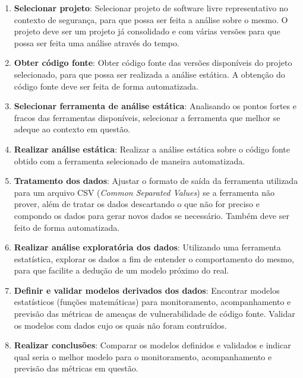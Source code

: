 \begin{enumerate}
  \item \textbf{Selecionar projeto}: Selecionar projeto de software livre
  representativo no contexto de segurança, para que possa ser feita a análise
  sobre o mesmo. O projeto deve ser um projeto já consolidado e com várias
  versões para que possa ser feita uma análise através do tempo.

  \item \textbf{Obter código fonte}: Obter código fonte das versões disponíveis
  do projeto selecionado, para que possa ser realizada a análise estática. A
  obtenção do código fonte deve ser feita de forma automatizada.

  \item \textbf{Selecionar ferramenta de análise estática}: Analisando os pontos
  fortes e fracos das ferramentas disponíveis, selecionar a ferramenta que
  melhor se adeque ao contexto em questão.

  \item \textbf{Realizar análise estática}: Realizar a análise estática sobre o
  código fonte obtido com a ferramenta selecionado de maneira automatizada.

  \item \textbf{Tratamento dos dados}: Ajustar o formato de saída da ferramenta
  utilizada para um arquivo CSV (\textit{Common Separated Values}) se a
  ferramenta não prover, além de tratar os dados descartando o que não for
  preciso e compondo os dados para gerar novos dados se necessário. Também deve
  ser feito de forma automatizada.

  \item \textbf{Realizar análise exploratória dos dados}: Utilizando uma
  ferramenta estatística, explorar os dados a fim de entender o comportamento do
  mesmo, para que facilite a dedução de um modelo próximo do real.

  \item \textbf{Definir e validar modelos derivados dos dados}: Encontrar
  modelos estatísticos (funções matemáticas) para monitoramento, acompanhamento e
  previsão das métricas de ameaças de vulnerabilidade de código fonte. Validar
  os modelos com dados cujo os quais não foram contruídos.

  \item \textbf{Realizar conclusões}: Comparar os modelos definidos e validados
  e indicar qual seria o melhor modelo para o monitoramento, acompanhamento e
  previsão das métricas em questão.
\end{enumerate}


